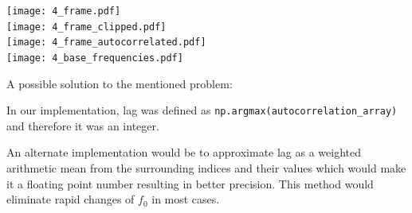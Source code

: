 \documentclass[a4paper, 11pt]{article}
\begin{document}
\begin{enumerate}
		\texttt{[image: 4\_frame.pdf]} \\
		\texttt{[image: 4\_frame\_clipped.pdf]} \\
		\texttt{[image: 4\_frame\_autocorrelated.pdf]} \\
		\texttt{[image: 4\_base\_frequencies.pdf]}

		A possible solution to the mentioned problem:

		In our implementation, lag was defined as \texttt{np.argmax(autocorrelation\_array)} and therefore it was an integer.

		An alternate implementation would be to approximate lag as a weighted arithmetic mean from the surrounding indices and their values
		which would make it a floating point number resulting in better precision.
		This method would eliminate rapid changes of $f_0$ in most cases.
	\end{enumerate}
\end{document}
